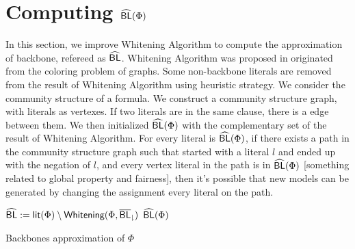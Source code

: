 

\section{Computing ${\sf \widehat{BL}}(\Phi)$}

In this section, we improve Whitening Algorithm to compute the approximation of backbone, refereed as ${\sf \widehat{BL}}$. Whitening Algorithm was proposed in \cite{CJG2001} originated from the coloring problem of graphs. Some non-backbone literals are removed from the result of Whitening Algorithm using heuristic strategy. We consider the community structure of a formula. We construct a community structure graph, with literals as vertexes. If two literals are in the same clause, there is a edge between them. We then initialized ${\sf \widehat{BL}}(\Phi)$ with the complementary set of the result of Whitening Algorithm. For every literal is ${\sf \widehat{BL}}(\Phi)$, if there exists a path in the community structure graph such that started with a literal $l$ and ended up with the negation of $l$, and every vertex literal in the path is in ${\sf \widehat{BL}}(\Phi)$ [something related to global property and fairness], then it's possible that new models can be generated by changing the assignment every literal on the path.

\begin{algorithm}
\SetAlgoShortEnd
\SetFillComment
{}


${\sf \widehat{BL}}:=\textsf{lit}(\Phi)\setminus{\textsf{Whitening}}(\Phi,{\sf \overline{BL}_\downharpoonright})$\;
\Return ${\sf \widehat{BL}}(\Phi)$\;
\caption{Backbones approximation of $\Phi$}
\label{alg:nBLo}
\end{algorithm}

